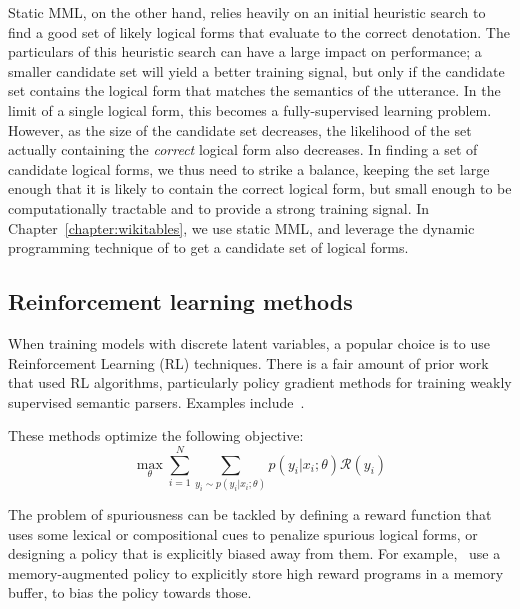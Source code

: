 Static MML, on the other hand, relies heavily on an initial heuristic search to
find a good set of likely logical forms that evaluate to the correct
denotation.  The particulars of this heuristic search can have a large impact
on performance; a smaller candidate set will yield a better training signal,
but only if the candidate set contains the logical form that matches the
semantics of the utterance.  In the limit of a single logical form, this
becomes a fully-supervised learning problem.  However, as the size of the
candidate set decreases, the likelihood of the set actually containing the
\emph{correct} logical form also decreases.  In finding a set of candidate
logical forms, we thus need to strike a balance, keeping the set large enough
that it is likely to contain the correct logical form, but small enough to be
computationally tractable and to provide a strong training signal.
In Chapter~\ref{chapter:wikitables}, we use static MML, and leverage the dynamic
programming technique of \citet{pasupat2016inferring} to get a candidate set of logical
forms.

\subsection{Reinforcement learning methods}
When training models with discrete latent variables, a popular choice is to use
Reinforcement Learning (RL) techniques. There is a fair amount of prior work that
used RL algorithms, particularly policy gradient methods for training weakly
supervised semantic parsers. Examples
include~\cite{Andreas2016LearningTC,Liang2016NeuralSM,guu2017bridging,liang2018memory}.

These methods optimize the following objective:
\begin{equation}
	\max_{\theta} \sum_{i=1}^N \sum_{y_i \sim p(y_i|x_i;\theta)} p(y_i|x_i;\theta) \mathcal{R}(y_i)
	\label{eq:rl_objective}
\end{equation}

The problem of spuriousness can be tackled by defining a reward
function that uses some lexical or compositional cues to penalize spurious
logical forms, or designing a policy that is explicitly biased away from them.
For example,~\cite{liang2018memory} use a memory-augmented policy to explicitly store high
reward programs in a memory buffer, to bias the policy towards those.

